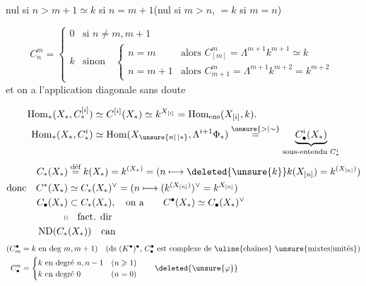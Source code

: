 nul si $n>m+1$\quad $\simeq k$ si $n=m+1$\qquad (nul si $m>n$, $=k$ si $m=n$)

\[
C^m_n=\begin{cases}
0 &\text{si }n\neq m,m+1\\
k &\text{sinon}\quad
\begin{cases}
n=m&\text{alors }C^m_{[m]}=\Lambda^{m+1} k^{m+1}\simeq k\\
n=m+1&\text{alors }C^m_{m+1}=\Lambda^{m+1}k^{m+2}=k^{m+2}
\end{cases}
\end{cases}
\]
et on a l'application diagonale sans doute

\[
\begin{aligned}
\operatorname{Hom}_*(X_*,C^{[i]}_*)&\simeq C^{[i]}(X_*)\simeq k^{X_{[i]}}=\operatorname{Hom}_{\text{ens}}(X_{[i]},k).\\
\operatorname{Hom}_*(X_*,C^i_*)&\simeq\operatorname{Hom}(X_{\unsure{n|\,|*}},\Lambda^{i+1}\Phi_*)\overset{\unsure{>|\sim}}{=}\underbrace{C^i_\bullet(X_*)}_{\text{sous-entendu }C^i_*}
\end{aligned}
\]
\[
\begin{aligned}
C_*(X_*)&\overset{\text{déf}}{=}k(X_*)=k^{(X_*)}=(n\longmapsto \deleted{\unsure{k}}k(X_{[n]})=k^{(X_{[n]})})\\
\text{donc}\quad C^*(X_*)&\simeq C_*(X_*)^\vee=(n\longmapsto (k^{(X_{[n]})})^\vee=k^{X_{[n]}})\\
C_\bullet(X_*)&\subset C_*(X_*),\quad\text{on a}\qquad C^\bullet(X_*)\simeq C_\bullet(X_*)^\vee\\
\shortparallel &\quad\text{fact. dir}\\
\operatorname{ND}(C_*&(X_*))\quad\text{can}
\end{aligned}
\]
\[
\begin{aligned}
(C^\bullet_m&=k\text{ en deg }m,m+1)\quad
\text{(ds $(K^\bullet)^\bullet$, $C_\bullet^\bullet$ est complexe de \uline{chaînes} \unsure{mixtes|unités})}\\
C_\bullet^n&=\begin{cases}k\text{ en degré }n,n-1 &(n\geqslant1)\\k\text{ en degré }0 &(n=0)\end{cases}\qquad\deleted{\unsure{\varphi}}
\end{aligned}
\]
